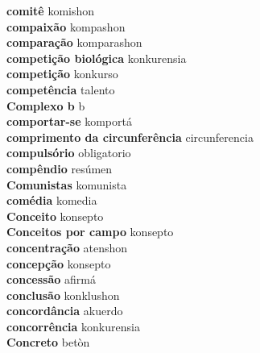 \textbf{ comitê  } komishon \\
\textbf{ compaixão  } kompashon \\
\textbf{ comparação  } komparashon \\
\textbf{ competição biológica  } konkurensia \\
\textbf{ competição  } konkurso \\
\textbf{ competência  } talento \\
\textbf{ Complexo b  } b \\
\textbf{ comportar-se  } komportá \\
\textbf{ comprimento da circunferência  } circunferencia \\
\textbf{ compulsório  } obligatorio \\
\textbf{ compêndio  } resúmen \\
\textbf{ Comunistas  } komunista \\
\textbf{ comédia  } komedia \\
\textbf{ Conceito  } konsepto \\
\textbf{ Conceitos por campo  } konsepto \\
\textbf{ concentração  } atenshon \\
\textbf{ concepção  } konsepto \\
\textbf{ concessão  } afirmá \\
\textbf{ conclusão  } konklushon \\
\textbf{ concordância  } akuerdo \\
\textbf{ concorrência  } konkurensia \\
\textbf{ Concreto  } betòn \\

